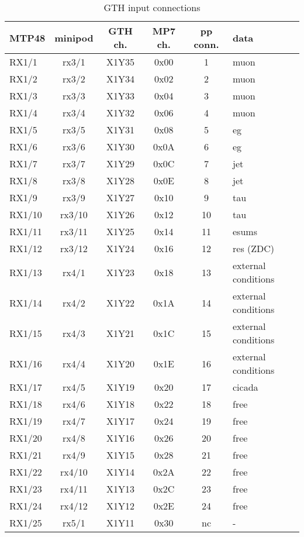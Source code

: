 \begin{longtable}{|l|c|c|c|c|l|}
\caption{GTH input connections}
    \label{tab:app:gth_i_conn}\\
\hline
\textbf{MTP48}& \textbf{minipod}& \textbf{GTH ch.}& \textbf{MP7 ch.} &\textbf{pp conn.}& \textbf{data}\\
\hline
\hline
\endhead
RX1/1  & rx3/1  & X1Y35 & 0x00 & 1  & muon\\\hline
RX1/2  & rx3/2  & X1Y34 & 0x02 & 2  & muon\\\hline
RX1/3  & rx3/3  & X1Y33 & 0x04 & 3  & muon\\\hline
RX1/4  & rx3/4  & X1Y32 & 0x06 & 4  & muon\\\hline
RX1/5  & rx3/5  & X1Y31 & 0x08 & 5  & eg\\\hline
RX1/6  & rx3/6  & X1Y30 & 0x0A & 6  & eg\\\hline
RX1/7  & rx3/7  & X1Y29 & 0x0C & 7  & jet\\\hline
RX1/8  & rx3/8  & X1Y28 & 0x0E & 8  & jet\\\hline
RX1/9  & rx3/9  & X1Y27 & 0x10 & 9  & tau\\\hline
RX1/10 & rx3/10 & X1Y26 & 0x12 & 10 & tau\\\hline
RX1/11 & rx3/11 & X1Y25 & 0x14 & 11 & esums\\\hline
RX1/12 & rx3/12 & X1Y24 & 0x16 & 12 & res (ZDC)\\\hline
RX1/13 & rx4/1  & X1Y23 & 0x18 & 13 & external conditions\\\hline
RX1/14 & rx4/2  & X1Y22 & 0x1A & 14 & external conditions\\\hline
RX1/15 & rx4/3  & X1Y21 & 0x1C & 15 & external conditions\\\hline
RX1/16 & rx4/4  & X1Y20 & 0x1E & 16 & external conditions\\\hline
RX1/17 & rx4/5  & X1Y19 & 0x20 & 17 & cicada\\\hline
RX1/18 & rx4/6  & X1Y18 & 0x22 & 18 & free\\\hline
RX1/19 & rx4/7  & X1Y17 & 0x24 & 19 & free\\\hline
RX1/20 & rx4/8  & X1Y16 & 0x26 & 20 & free\\\hline
RX1/21 & rx4/9  & X1Y15 & 0x28 & 21 & free\\\hline
RX1/22 & rx4/10 & X1Y14 & 0x2A & 22 & free\\\hline
RX1/23 & rx4/11 & X1Y13 & 0x2C & 23 & free\\\hline
RX1/24 & rx4/12 & X1Y12 & 0x2E & 24 & free\\\hline
RX1/25 & rx5/1  & X1Y11 & 0x30 & nc & -\\\hline

\end{longtable}

